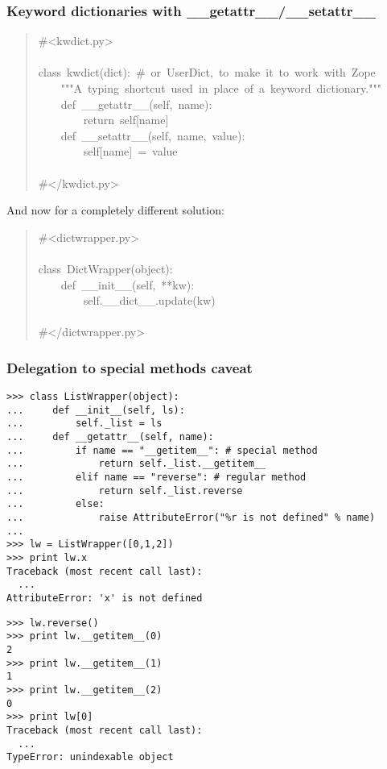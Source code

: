 \documentclass[10pt,a4paper,english]{article}
\begin{document}
\subsubsection*{Keyword dictionaries with {\_}{\_}getattr{\_}{\_}/{\_}{\_}setattr{\_}{\_}}
\begin{quote}{\ttfamily \raggedright \noindent
{\#}<kwdict.py>~\\
~\\
class~kwdict(dict):~{\#}~or~UserDict,~to~make~it~to~work~with~Zope~\\
~~~~"{}"{}"A~typing~shortcut~used~in~place~of~a~keyword~dictionary."{}"{}"~\\
~~~~def~{\_}{\_}getattr{\_}{\_}(self,~name):~\\
~~~~~~~~return~self{[}name]~\\
~~~~def~{\_}{\_}setattr{\_}{\_}(self,~name,~value):~\\
~~~~~~~~self{[}name]~=~value~\\
~\\
{\#}</kwdict.py>
}\end{quote}

And now for a completely different solution:
\begin{quote}{\ttfamily \raggedright \noindent
{\#}<dictwrapper.py>~\\
~\\
class~DictWrapper(object):~~\\
~~~~def~{\_}{\_}init{\_}{\_}(self,~**kw):~\\
~~~~~~~~self.{\_}{\_}dict{\_}{\_}.update(kw)~\\
~\\
{\#}</dictwrapper.py>
}\end{quote}



\hypertarget{delegation-to-special-methods-caveat}{}
\subsubsection*{Delegation to special methods caveat}
\begin{verbatim}>>> class ListWrapper(object):
...     def __init__(self, ls):
...         self._list = ls
...     def __getattr__(self, name):
...         if name == "__getitem__": # special method
...             return self._list.__getitem__
...         elif name == "reverse": # regular method
...             return self._list.reverse
...         else:
...             raise AttributeError("%r is not defined" % name)
... 
>>> lw = ListWrapper([0,1,2])
>>> print lw.x
Traceback (most recent call last):
  ...
AttributeError: 'x' is not defined\end{verbatim}
\begin{verbatim}>>> lw.reverse()
>>> print lw.__getitem__(0)
2
>>> print lw.__getitem__(1)
1
>>> print lw.__getitem__(2)
0
>>> print lw[0]
Traceback (most recent call last):
  ...
TypeError: unindexable object\end{verbatim}
\end{document}
